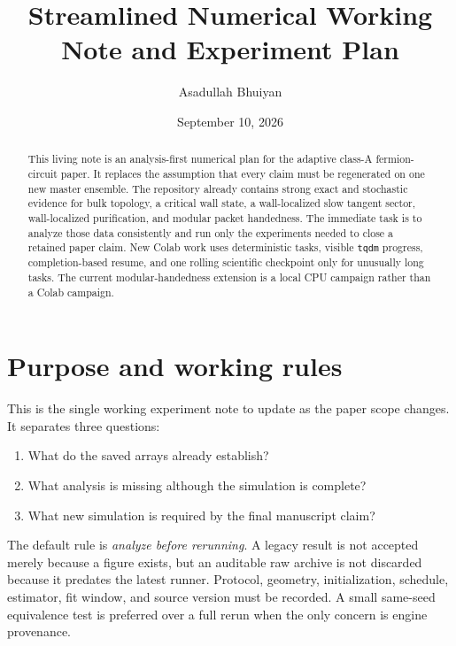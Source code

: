 \documentclass[aps,prx,twocolumn,floatfix,nofootinbib,superscriptaddress]{revtex4-2}
\newcommand{\code}[1]{\texttt{#1}}
\begin{document}
\title{Streamlined Numerical Working Note and Experiment Plan}
\author{Asadullah Bhuiyan}
\date{September 10, 2026}

\begin{abstract}
This living note is an analysis-first numerical plan for the adaptive class-A
fermion-circuit paper.  It replaces the assumption that every claim must be
regenerated on one new master ensemble.  The repository already contains strong
exact and stochastic evidence for bulk topology, a critical wall state, a
wall-localized slow tangent sector, wall-localized purification, and modular
packet handedness.  The immediate task is to analyze those data consistently
and run only the experiments needed to close a retained paper claim.  New Colab
work uses deterministic tasks, visible \code{tqdm} progress, completion-based
resume, and one rolling scientific checkpoint only for unusually long tasks.
The current modular-handedness extension is a local CPU campaign rather than a
Colab campaign.
\end{abstract}

\maketitle

\section{Purpose and working rules}

This is the single working experiment note to update as the paper scope changes.
It separates three questions:
\begin{enumerate}
\item What do the saved arrays already establish?
\item What analysis is missing although the simulation is complete?
\item What new simulation is required by the final manuscript claim?
\end{enumerate}

The default rule is \emph{analyze before rerunning}.  A legacy result is not
accepted merely because a figure exists, but an auditable raw archive is not
discarded because it predates the latest runner.  Protocol, geometry,
initialization, schedule, estimator, fit window, and source version must be
recorded.  A small same-seed equivalence test is preferred over a full rerun
when the only concern is engine provenance.
\end{document}
